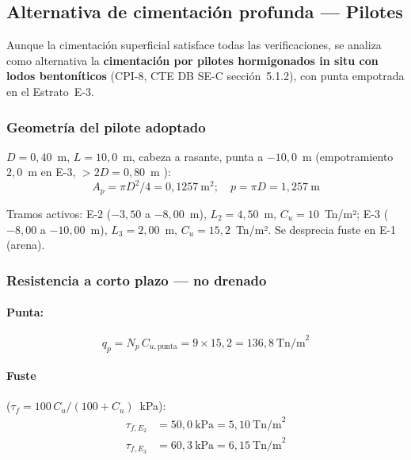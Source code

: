 \subsection{Alternativa de cimentación profunda --- Pilotes}
\label{subsec:pilotes_arqueta}

Aunque la cimentación superficial satisface todas las verificaciones, se
analiza como alternativa la \textbf{cimentación por pilotes hormigonados
in situ con lodos bentoníticos} (CPI-8, CTE DB SE-C sección~5.1.2), con punta
empotrada en el Estrato~E-3.

\subsubsection{Geometría del pilote adoptado}

$D=0{,}40$~m, $L=10{,}0$~m, cabeza a rasante, punta a $-10{,}0$~m
(empotramiento $2{,}0$~m en E-3, $>2D=0{,}80$~m \checkmark):
\[
  A_p = \pi D^2/4 = 0{,}1257~\text{m}^2;\quad
  p   = \pi D = 1{,}257~\text{m}
\]

Tramos activos: E-2 ($-3{,}50$ a $-8{,}00$~m), $L_2=4{,}50$~m,
$C_u=10$~Tn/m²; E-3 ($-8{,}00$ a $-10{,}00$~m), $L_3=2{,}00$~m,
$C_u=15{,}2$~Tn/m². Se desprecia fuste en E-1 (arena).

\subsubsection{Resistencia a corto plazo — no drenado}

\paragraph{Punta:}
\[
  q_p = N_p\,C_{u,\text{punta}} = 9\times15{,}2 = 136{,}8~\text{Tn/m}^2
\]

\paragraph{Fuste} ($\tau_f = 100\,C_u/(100+C_u)$~kPa):
\begin{align*}
  \tau_{f,E_2} &= 50{,}0~\text{kPa} = 5{,}10~\text{Tn/m}^2\\
  \tau_{f,E_3} &= 60{,}3~\text{kPa} = 6{,}15~\text{Tn/m}^2
\end{align*}

